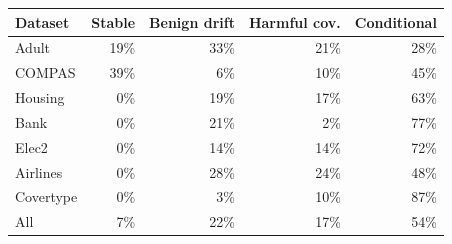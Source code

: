 \begin{tabular}{lrrrr}
\toprule
Dataset & Stable & Benign drift & Harmful cov. & Conditional \\
\midrule
Adult & 19\% & 33\% & 21\% & 28\% \\
COMPAS & 39\% & 6\% & 10\% & 45\% \\
Housing & 0\% & 19\% & 17\% & 63\% \\
Bank & 0\% & 21\% & 2\% & 77\% \\
Elec2 & 0\% & 14\% & 14\% & 72\% \\
Airlines & 0\% & 28\% & 24\% & 48\% \\
Covertype & 0\% & 3\% & 10\% & 87\% \\
\midrule All & 7\% & 22\% & 17\% & 54\% \\
\bottomrule
\end{tabular}